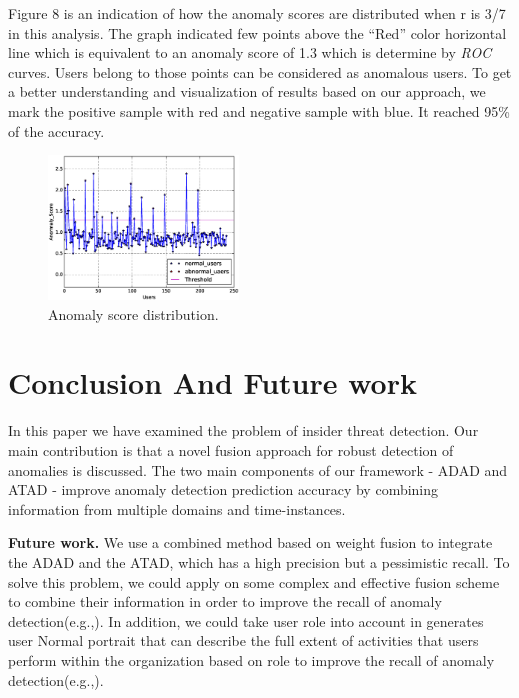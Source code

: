 \documentclass[conference]{IEEEtran}
\begin{document}
Figure 8 is an indication of how the anomaly scores are distributed when r is 3/7 in this analysis. The graph indicated few points above the “Red” color horizontal line which is equivalent to an anomaly score of 1.3 which is determine by \emph{ROC} curves. Users belong to those points can be considered as anomalous users. To get a better understanding and visualization of results based on our approach, we mark the positive sample with red and negative sample with blue. It reached 95\% of the accuracy.

\begin{figure}[htb]
\centerline{\includegraphics[width = 0.45\textwidth]{figure/figure8.eps}}
\caption{Anomaly score distribution.}
\label{fig}
\end{figure}

\section{Conclusion And Future work}

In this paper we have examined the problem of insider threat detection. Our main contribution is that a novel fusion approach for robust detection of anomalies is discussed. The two main components of our framework - ADAD and ATAD - improve anomaly detection prediction accuracy by combining information from multiple domains and time-instances.

\textbf{Future work.}
We use a combined method based on weight fusion to integrate the ADAD and the ATAD, which has a high precision but a pessimistic recall. To solve this problem, we could apply on some complex and effective fusion scheme to combine their information in order to improve the recall of anomaly detection(e.g.,\cite{b49}).  In addition, we could take user role into account in generates user Normal portrait that can describe the full extent of activities that users perform within the organization based on role to improve the recall of anomaly detection(e.g.,\cite{b50}).   	
\end{document}
